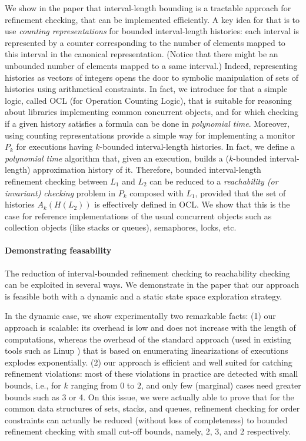We show in the paper that interval-length bounding is a tractable approach for
refinement checking, that can be implemented efficiently. A key idea for that
is to use \emph{counting representations} for bounded interval-length
histories: each interval is represented by a counter corresponding to the
number of elements mapped to this interval in the canonical representation.
(Notice that there might be an unbounded number of elements mapped to a same
interval.) Indeed, representing histories as vectors of integers opens the door
to symbolic manipulation of sets of histories using arithmetical constraints.
In fact, we introduce for that a simple logic, called OCL (for Operation
Counting Logic), that is suitable for reasoning about libraries implementing
common concurrent objects, and for which checking if a given history satisfies
a formula can be done in \emph{polynomial time}. Moreover, using counting
representations provide a simple way for implementing a monitor $P_k$ for
executions having $k$-bounded interval-length histories. In fact, we define a
\emph{polynomial time} algorithm that, given an execution, builds a
($k$-bounded interval-length) approximation history of it. Therefore, bounded
interval-length refinement checking between $L_1$ and $L_2$ can be reduced to a
\emph{reachability (or invariant) checking} problem in $P_k$ composed with
$L_1$, provided that the set of histories $A_k(H(L_2))$ is effectively defined
in OCL. We show that this is the case for reference implementations of the
usual concurrent objects such as collection objects (like stacks or queues),
semaphores, locks, etc.

\paragraph{Demonstrating feasability}

The reduction of interval-bounded refinement checking to reachability checking
can be exploited in several ways. We demonstrate in the paper that our approach
is feasible both with a dynamic and a static state space exploration strategy.

In the dynamic case, we show experimentally two remarkable facts: (1) our
approach is scalable: its overhead is low and does not increase with the length
of computations, whereas the overhead of the standard approach (used in
existing tools such as Linup \cite{}) that is based on enumerating
linearizations of executions explodes exponentially. (2) our approach is
efficient and well suited for catching refinement violations: most of these
violations in practice are detected with small bounds, i.e., for $k$ ranging
from 0 to $2$, and only few (marginal) cases need greater bounds such as 3 or
4. On this issue, we were actually able to prove that for the common data
structures of sets, stacks, and queues, refinement checking for order
constraints can actually be reduced (without loss of completeness) to bounded
refinement checking with small cut-off bounds, namely, 2, 3, and 2 respectively.

